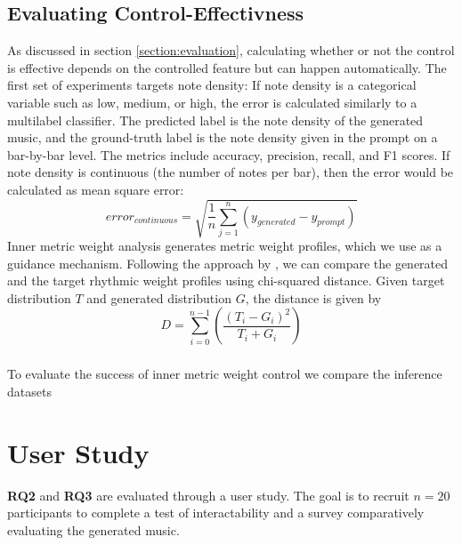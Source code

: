 \subsection{Evaluating Control-Effectivness}
As discussed in section \ref{section:evaluation}, calculating whether or not the control is effective depends on the controlled feature but can happen automatically. 
The first set of experiments targets note density: If note density is a categorical variable such as low, medium, or high, the error is calculated similarly to a multilabel classifier. The predicted label is the note density of the generated music, and the ground-truth label is the note density given in the prompt on a bar-by-bar level. 
The metrics include accuracy, precision, recall, and F1 scores. 
If note density is continuous (the number of notes per bar), then the error would be calculated as mean square error: 
\begin{equation}
 error_{continuous} = \sqrt{\frac{1}{n}\sum_{j=1}^{n}(y_{generated}-y_{prompt})}
\end{equation}
Inner metric weight analysis generates metric weight profiles, which we use as a guidance mechanism. Following the approach by \cite{Bemman2024}, we can compare the generated and the target rhythmic weight profiles using chi-squared distance.
Given target distribution $T$ and generated distribution $G$, the distance is given by 
\begin{equation}
D=\sum_{i=0}^{n-1}(\frac{(T_i-G_i)^2}{T_i+G_i})
\end{equation}
\subsubsection{}
To evaluate the success of inner metric weight control we compare the inference datasets 
\section{User Study}
\textbf{RQ2} and \textbf{RQ3} are evaluated through a user study. The goal is to recruit $n=20$ participants to complete a test of interactability and a survey comparatively evaluating the generated music. 

